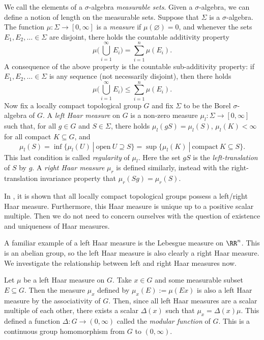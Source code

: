 \documentclass[11pt]{amsart}
\theoremstyle{remark}
\begin{document}
We call the elements of a $\sigma$-algebra \emph{measurable sets}.
Given a $\sigma$-algebra, we can define a notion of length on the measurable sets.
Suppose that $\Sigma$ is a $\sigma$-algebra.
The function $\mu\colon\Sigma\to[0,\infty]$ is a \emph{measure} if $\mu(\varnothing)=0$, and whenever the sets $E_1,E_2,\ldots\in\Sigma$ are disjoint, there holds the countable additivity property
\[
	\mu\Bigg(\bigcup_{i=1}^\infty E_i\Bigg) = \sum_{i=1}^n \mu(E_i).
\]
A consequence of the above property is the countable sub-additivity property: if $E_1,E_2,\ldots\in\Sigma$ is any sequence (not necessarily disjoint), then there holds
\[
	\mu\Bigg(\bigcup_{i=1}^\infty E_i\Bigg) \leq \sum_{i=1}^n \mu(E_i).
\]
Now fix a locally compact topological group $G$ and fix $\Sigma$ to be the Borel $\sigma$-algebra of $G$.
A \emph{left Haar measure} on $G$ is a non-zero measure $\mu_l\colon \Sigma\to [0,\infty]$ such that, for all $g\in G$ and $S\in\Sigma$, there holds $\mu_l(gS)=\mu_l(S)$, $\mu_l(K)<\infty$ for all compact $K\subseteq G$, and
\[
	\mu_l(S)=\inf\{\mu_l(U)\ |\ \text{open}\ U\supseteq S\} = \sup\{\mu_l(K)\ |\ \text{compact}\ K\subseteq S\}.
\]
This last condition is called \emph{regularity} of $\mu_l$.
Here the set $gS$ is the \emph{left-translation} of $S$ by $g$.
A \emph{right Haar measure} $\mu_r$ is defined similarly, instead with the right-translation invariance property that $\mu_r(Sg)=\mu_r(S)$.

In \cite{Folland84}, it is shown that all locally compact topological groups possess a left/right Haar measure.
Furthermore, this Haar measure is unique up to a positive scalar multiple.
Then we do not need to concern ourselves with the question of existence and uniqueness of Haar measures.

A familiar example of a left Haar measure is the Lebesgue measure on $\RR^n$.
This is an abelian group, so the left Haar measure is also clearly a right Haar measure.
We investigate the relationship between left and right Haar measures now.

Let $\mu$ be a left Haar measure on $G$.
Take $x\in G$ and some measurable subset $E\subseteq G$.
Then the measure $\mu_x$ defined by $\mu_x(E) := \mu(Ex)$ is also a left Haar measure by the associativity of $G$.
Then, since all left Haar measures are a scalar multiple of each other, there exists a scalar $\Delta(x)$ such that $\mu_x = \Delta(x)\mu$.
This defined a function $\Delta\colon G\to (0,\infty)$ called the \emph{modular function} of $G$.
This is a continuous group homomorphism from $G$ to $(0,\infty)$.
\end{document}
